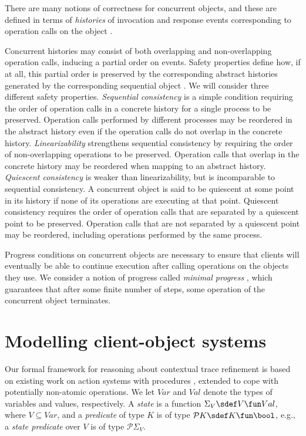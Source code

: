 \documentclass[11pt]{llncs}
\newcommand{\mcP}{\mathcal{P}}
\begin{document}
There are many notions of
correctness for concurrent objects, and these are defined in terms of
\emph{histories} of invocation and response events corresponding to
operation calls on the object \cite{HeSh08}.

Concurrent histories may consist of both overlapping and
non-overlapping operation calls, inducing a partial order on
events. Safety properties define how, if at all, this partial order is
preserved by the corresponding abstract histories
generated by the corresponding sequential object
\cite{HeSh08,DDGS15-ECOOP}.  We will consider three different safety
properties. \emph{Sequential consistency} is a simple condition
requiring the order of operation calls in a concrete history for a
single process to be preserved. Operation calls performed by different
processes may be reordered in the abstract history even if the
operation calls do not overlap in the concrete history.
\emph{Linearizability} strengthens sequential consistency by requiring
the order of non-overlapping operations to be preserved. Operation
calls that overlap in the concrete history may be reordered when
mapping to an abstract history. \emph{Quiescent consistency} is weaker
than linearizability, but is incomparable to sequential consistency. A
concurrent object is said to be quiescent at some point in its history
if none of its operations are executing at that point. Quiescent
consistency requires the order of operation calls that are separated
by a quiescent point to be preserved.  Operation calls that are not
separated by a quiescent point may be reordered, including operations
performed by the same process.

Progress conditions on concurrent objects are necessary to ensure that
clients will eventually be able to continue execution after calling
operations on the objects they use. We consider a notion of progress
called \emph{minimal progress} \cite{HS11}, which guarantees that
after some finite number of steps, some operation of the concurrent
object terminates.
\vspace{-2mm}

\section{Modelling client-object systems}
\label{sec:modell-client-object-2}
Our formal framework for reasoning about contextual trace refinement
is based on existing work on action systems with procedures
\cite{SereW00}, extended to cope with potentially non-atomic
operations. We let $Var$ and $Val$ denote the types of variables and
values, respectively. A \emph{state} is a function
$\Sigma_{V} \sdef V \fun Val$, where $V \subseteq Var$, and a
\emph{predicate} of type $K$ is of type $\mcP K \sdef K \fun \bool$,
e.g., a \emph{state predicate} over $V$ is of type $\mcP \Sigma_{V}$.
\end{document}
